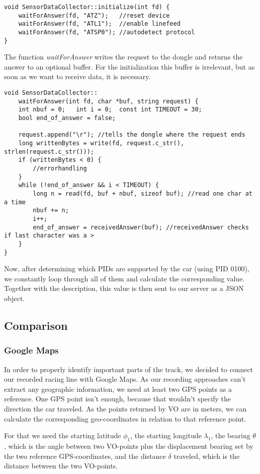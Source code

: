 \begin{lstlisting}
void SensorDataCollector::initialize(int fd) {
	waitForAnswer(fd, "ATZ");	//reset device
	waitForAnswer(fd, "ATL1");	//enable linefeed
	waitForAnswer(fd, "ATSP0");	//autodetect protocol
}
\end{lstlisting}
The function \textit{waitForAnswer} writes the request to the dongle and returns the answer to an optional buffer. For the initialization this buffer is irrelevant, but as soon as we want to receive data, it is necessary.
\begin{lstlisting}
void SensorDataCollector::
	waitForAnswer(int fd, char *buf, string request) {
	int nbuf = 0; 	int i = 0;	const int TIMEOUT = 30;
	bool end_of_answer = false;

	request.append("\r"); //tells the dongle where the request ends
	long writtenBytes = write(fd, request.c_str(), strlen(request.c_str()));
	if (writtenBytes < 0) {
		//errorhandling
	}
	while (!end_of_answer && i < TIMEOUT) {
		long n = read(fd, buf + nbuf, sizeof buf); //read one char at a time
		nbuf += n;
		i++;
		end_of_answer = receivedAnswer(buf); //receivedAnswer checks if last character was a >
	}
}
\end{lstlisting}

Now, after determining which PIDs are supported by the car (using PID 0100), we constantly loop through all of them and calculate the corresponding value. Together with the description, this value is then sent to our server as a JSON object.

\subsection{Comparison}
\subsubsection{Google Maps}
In order to properly identify important parts of the track, we decided to connect our recorded racing line with Google Maps. As our recording approaches can't extract any geographic information, we need at least two GPS points as a reference. One GPS point isn't enough, because that wouldn't specify the direction the car traveled. As the points returned by VO are in meters, we can calculate the corresponding geo-coordinates in relation to that reference point. 

For that we need the starting latitude $\phi_1$, the starting longitude $\lambda_1$, the bearing $\theta$, which is the angle between two VO-points plus the displacement bearing set by the two reference GPS-coordinates, and the distance $\delta$ traveled, which is the distance between the two VO-points.

